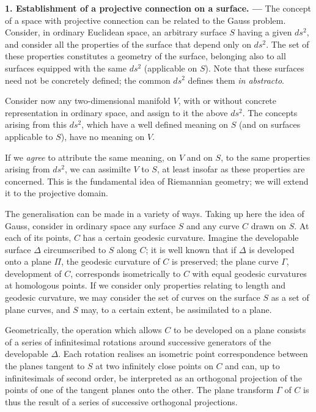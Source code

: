 

{\bf 1.  Establishment of a projective connection on a surface. --- }
%
The concept of a space with projective connection can be related to the Gauss problem. Consider, in ordinary Euclidean space, an arbitrary surface $S$ having a given $ds^2$, and consider all the properties of the surface that depend only on $ds^2$. The set of these properties constitutes a geometry of the surface, belonging also to all surfaces equipped with the same $ds^2$ (applicable on $S$). Note that these surfaces need not be concretely defined; the common $ds^2$ defines them {\em in abstracto}.

Consider now any two-dimensional manifold $V$, with or without concrete representation in ordinary space, and assign to it the above $ds^2$. The concepts arising from this $ds^2$, which have a well defined meaning on $S$ (and on surfaces applicable to $S$), have no meaning on $V$.

If we {\em agree} to attribute the same meaning, on $V$ and on $S$, to the same properties arising from $ds^2$, we can assimilte $V$ to $S$, at least insofar as these properties are concerned. This is the fundamental idea of Riemannian geometry; we will extend it to the projective domain.

The generalisation can be made in a variety of ways. Taking up here the idea of Gauss, consider in ordinary space any surface $S$ and any curve $C$ drawn on $S$. At each of its points, $C$ has a certain geodesic curvature. Imagine the developable surface $\Delta$ circumscribed to $S$ along $C$; it is well known that if $\Delta$ is developed onto a plane $\Pi$, the geodesic curvature of $C$ is preserved; the plane curve $\Gamma$,  development of $C$, corresponds isometrically to $C$ with equal geodesic curvatures at homologous points. If we consider only properties relating to length and geodesic curvature, we may consider the set of curves on the surface $S$ as a set of plane curves, and $S$ may, to a certain extent, be assimilated to a plane.

Geometrically, the operation which allows $C$ to be developed on a plane consists of a series of infinitesimal rotations around successive generators of the developable $\Delta$. Each rotation realises an isometric point correspondence between the planes tangent to $S$ at two infinitely close points on $C$ and can, up to infinitesimals of second order, be interpreted as an orthogonal projection of the points of one of the tangent planes onto the other. The plane transform $\Gamma$ of $C$ is thus the result of a series of successive orthogonal projections. 

